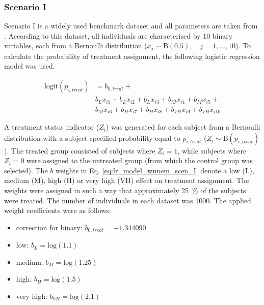 		\subsubsection{Scenario I}
		\label{sec:wnnem_scen_1}
								
		Scenario I is a widely used benchmark dataset and all parameters are taken from \cite{austin2011comparing}. According to this dataset, all individuals are characterised by 10 binary variables, each from a Bernoulli distribution ($x_j\sim\textrm{B}(0.5), \quad j=1,\dots,10$). To calculate the probability of treatment assignment, the following logistic regression model was used.
								
		\begin{equation}
			\label{eq:lr_model_wnnem_scen_I}
			\begin{split}
				\textrm{logit}(p_{i,treat}) &= b_{0,treat} + \\
				& b_L x_{i1} + b_L x_{i2} + b_L x_{i3} + b_M x_{i4} + b_M x_{i5} +  \\
				& b_M x_{i6} + b_H x_{i7} + b_H x_{i8} + b_{VH} x_{i9} + b_{VH} x_{i10}
			\end{split}
		\end{equation} 
				  
		A treatment status indicator ($Z_i$) was generated for each subject from a Bernoulli distribution with a subject-specified probability equal to $p_{i, treat}$ ($Z_i\sim\textrm{B}(p_{i, treat})$). The treated group consisted of subjects where $Z_i=1$, while subjects where $Z_i=0$ were assigned to the untreated group (from which the control group was selected). The $b$ weights in Eq. \ref{eq:lr_model_wnnem_scen_I} denote a low (L), medium (M), high (H) or very high (VH) effect on treatment assignment. The weights were assigned in such a way that approximately \SI{25}{\percent} of the subjects were treated. The number of individuals in each dataset was 1000. The applied weight coefficients were as follows:
								
		\begin{itemize}
			\item correction for binary: $b_{0,treat}=-1.344090$
			\item low: $b_L=\textrm{log}(1.1)$
			\item medium: $b_M=\textrm{log}(1.25)$
			\item high: $b_H=\textrm{log}(1.5)$
			\item very high: $b_{VH}=\textrm{log}(2.1)$
		\end{itemize}
								
